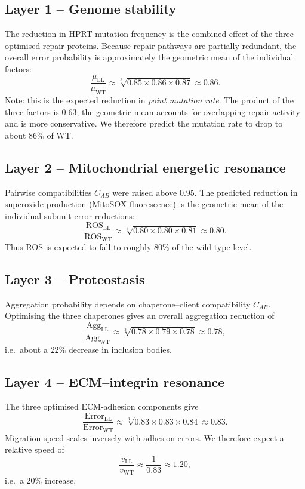\documentclass[12pt,a4paper]{article}
\begin{document}
	\subsection{Layer 1 – Genome stability}
	The reduction in HPRT mutation frequency is the combined effect of the three optimised repair proteins. Because repair pathways are partially redundant, the overall error probability is approximately the geometric mean of the individual factors:
	\[
	\frac{\mu_{\mathrm{LL}}}{\mu_{\mathrm{WT}}} \approx \sqrt[3]{0.85 \times 0.86 \times 0.87} \approx 0.86.
	\]
	Note: this is the expected reduction in \emph{point mutation rate}. The product of the three factors is \(0.63\); the geometric mean accounts for overlapping repair activity and is more conservative. We therefore predict the mutation rate to drop to about \(86\%\) of WT.
	
	\subsection{Layer 2 – Mitochondrial energetic resonance}
	Pairwise compatibilities \(C_{AB}\) were raised above 0.95. The predicted reduction in superoxide production (MitoSOX fluorescence) is the geometric mean of the individual subunit error reductions:
	\[
	\frac{\mathrm{ROS}_{\mathrm{LL}}}{\mathrm{ROS}_{\mathrm{WT}}} \approx \sqrt[3]{0.80 \times 0.80 \times 0.81} \approx 0.80.
	\]
	Thus ROS is expected to fall to roughly \(80\%\) of the wild‑type level.
	
	\subsection{Layer 3 – Proteostasis}
	Aggregation probability depends on chaperone–client compatibility \(C_{AB}\). Optimising the three chaperones gives an overall aggregation reduction of
	\[
	\frac{\mathrm{Agg}_{\mathrm{LL}}}{\mathrm{Agg}_{\mathrm{WT}}} \approx \sqrt[3]{0.78 \times 0.79 \times 0.78} \approx 0.78,
	\]
	i.e.\ about a \(22\%\) decrease in inclusion bodies.
	
	\subsection{Layer 4 – ECM–integrin resonance}
	The three optimised ECM‑adhesion components give
	\[
	\frac{\mathrm{Error}_{\mathrm{LL}}}{\mathrm{Error}_{\mathrm{WT}}} \approx \sqrt[3]{0.83 \times 0.83 \times 0.84} \approx 0.83.
	\]
	Migration speed scales inversely with adhesion errors. We therefore expect a relative speed of
	\[
	\frac{v_{\mathrm{LL}}}{v_{\mathrm{WT}}} \approx \frac{1}{0.83} \approx 1.20,
	\]
	i.e.\ a 20\% increase.
	
\end{document}
